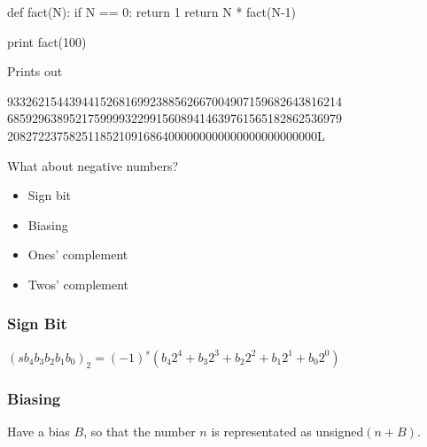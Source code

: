 \begin{frame}[fragile]
\begin{python}
def fact(N):
     if N == 0: return 1
     return N * fact(N-1)

print  fact(100)
\end{python}

Prints out

933262154439441526816992388562667004907159682643816214\\
685929638952175999932299156089414639761565182862536979\\
20827223758251185210916864000000000000000000000000L

\end{frame}

\begin{frame}[fragile]

What about negative numbers?

\end{frame}

\begin{frame}[fragile]

\begin{itemize}
\item Sign bit
\item Biasing
\item Ones' complement
\item Twos' complement
\end{itemize}
\end{frame}

\begin{frame}[fragile]
\frametitle{Sign Bit}

$(s b_4 b_3 b_2 b_1 b_0)_2 = (-1)^s \left(b_4 2^4 + b_3 2^3 + b_2 2^2 + b_1 2^1 + b_0 2^0 \right)$

\end{frame}

\begin{frame}[fragile]
\frametitle{Biasing}

Have a bias $B$, so that the number $n$ is representated as unsigned$(n+B)$.

\end{frame}

